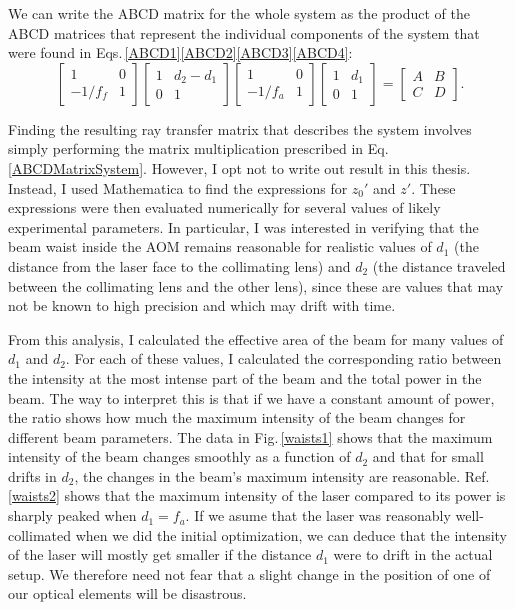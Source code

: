 We can write the ABCD matrix for the whole system as the product of the ABCD matrices that represent the individual components of the system that were found in Eqs.\,\ref{ABCD1}\ref{ABCD2}\ref{ABCD3}\ref{ABCD4}: 
\begin{equation}\label{ABCDMatrixSystem}
\begin{bmatrix}
1 & 0 \\ -1/f_{f} & 1
\end{bmatrix}
\begin{bmatrix}
1 & d_2-d_1 \\ 0 & 1
\end{bmatrix}
\begin{bmatrix}
1 & 0 \\ -1/f_{a} & 1
\end{bmatrix}
\begin{bmatrix}
1 & d_1 \\ 0 & 1
\end{bmatrix}
=
\begin{bmatrix}
A & B \\ C & D
\end{bmatrix}.
\end{equation}

Finding the resulting ray transfer matrix that describes the system involves simply performing the matrix multiplication prescribed in Eq.\,\ref{ABCDMatrixSystem}. However, I opt not to write out result in this thesis. Instead, I used Mathematica to find the expressions for $z_0'$ and $z'$. These expressions were then evaluated numerically for several values of likely experimental parameters. In particular, I was interested in verifying that the beam waist inside the AOM remains reasonable for realistic values of $d_1$ (the distance from the laser face to the collimating lens) and $d_2$ (the distance traveled between the collimating lens and the other lens), since these are values that may not be known to high precision and which may drift with time. %

From this analysis, I calculated the effective area of the beam for many values of $d_1$ and $d_2$. For each of these values, I calculated the corresponding ratio between the intensity at the most intense part of the beam and the total power in the beam. The way to interpret this is that if we have a constant amount of power, the ratio shows how much the maximum intensity of the beam changes for different beam parameters. The data in Fig.\,\ref{waists1} shows that the maximum intensity of the beam changes smoothly as a function of $d_2$ and that for small drifts in $d_2$, the changes in the beam's maximum intensity are reasonable. 
Ref.\,\ref{waists2} shows that the maximum intensity of the laser compared to its power is sharply peaked when $d_1=f_a$. If we asume that the laser was reasonably well-collimated when we did the initial optimization, we can deduce that the intensity of the laser will mostly get smaller if the distance $d_1$ were to drift in the actual setup. We therefore need not fear that a slight change in the position of one of our optical elements will be disastrous.

